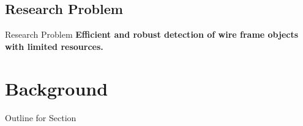 \documentclass{beamer}
\begin{document}
\begin{darkframes}
	\subsection{Research Problem}    
	\begin{frame}{Research Problem}
	\textbf{Efficient and robust detection of wire frame objects with limited resources.}
	\end{frame}
    \section{Background}
    \begin{frame}{Outline for Section \thesection}
    \tableofcontents[currentsection]
	\end{frame}

\end{darkframes}
\end{document}
